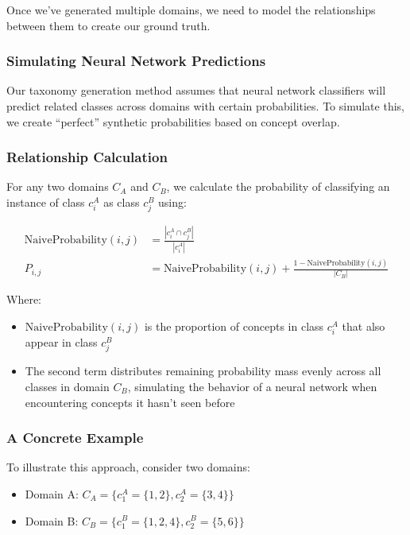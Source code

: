 Once we've generated multiple domains, we need to model the relationships between them to create our ground truth.

\subsubsection{Simulating Neural Network Predictions}

Our taxonomy generation method assumes that neural network classifiers will predict related classes across domains with certain probabilities. To simulate this, we create \enquote{perfect} synthetic probabilities based on concept overlap.

\subsubsection{Relationship Calculation}

For any two domains $C_A$ and $C_B$, we calculate the probability of classifying an instance of class $c^A_i$ as class $c^B_j$ using:

\begin{equation}
      \begin{aligned}
            \text{NaiveProbability}(i, j) & = \frac{|c^A_i \cap c^B_j|}{|c^A_i|}                                              \\
            P_{i,j}                       & = \text{NaiveProbability}(i, j) + \frac{1 - \text{NaiveProbability}(i, j)}{|C_B|}
      \end{aligned}
\end{equation}

Where:
\begin{itemize}
      \item $\text{NaiveProbability}(i, j)$ is the proportion of concepts in class $c_i^A$ that also appear in class $c_j^B$
      \item The second term distributes remaining probability mass evenly across all classes in domain $C_B$, simulating the behavior of a neural network when encountering concepts it hasn't seen before
\end{itemize}

\subsubsection{A Concrete Example}

To illustrate this approach, consider two domains:
\begin{itemize}
      \item Domain A: $C_A = \{c^A_1=\{1,2\}, c^A_2=\{3,4\}\}$
      \item Domain B: $C_B = \{c^B_1=\{1,2,4\}, c^B_2=\{5,6\}\}$
\end{itemize}

